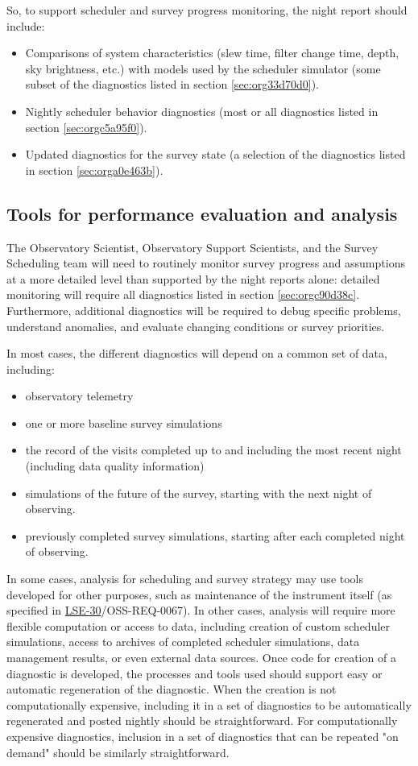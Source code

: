 So, to support scheduler and survey progress monitoring, the night report should include:
\begin{itemize}
\item Comparisons of system characteristics (slew time, filter change time, depth, sky brightness, etc.) with models used by the scheduler simulator (some subset of the diagnostics listed in section \ref{sec:org33d70d0}).
\item Nightly scheduler behavior diagnostics (most or all diagnostics listed in section \ref{sec:orgc5a95f0}).
\item Updated diagnostics for the survey state (a selection of the diagnostics listed in section \ref{sec:orga0e463b}).
\end{itemize}

\subsection{Tools for performance evaluation and analysis}
\label{sec:org88eed64}
The Observatory Scientist, Observatory Support Scientists, and the Survey Scheduling team will need to routinely monitor survey progress and assumptions at a more detailed level than supported by the night reports alone:
detailed monitoring will require all diagnostics listed in section \ref{sec:orgc90d38c}.
Furthermore, additional diagnostics will be required to debug specific problems, understand anomalies, and evaluate changing conditions or survey priorities.

In most cases, the different diagnostics will depend on a common set of data, including:
\begin{itemize}
\item observatory telemetry
\item one or more baseline survey simulations
\item the record of the visits completed up to and including the most recent night (including data quality information)
\item simulations of the future of the survey, starting with the next night of observing.
\item previously completed survey simulations, starting after each completed night of observing.
\end{itemize}

In some cases, analysis for scheduling and survey strategy may use tools developed for other purposes, such as maintenance of the instrument itself (as specified in \href{https://ls.st/lse-30}{LSE-30}/OSS-REQ-0067).
In other cases, analysis will require more flexible computation or access to data, including creation of custom scheduler simulations, access to archives of completed scheduler simulations, data management results, or even external data sources.
Once code for creation of a diagnostic is developed, the processes and tools used should support easy or automatic regeneration of the diagnostic.
When the creation is not computationally expensive, including it in a set of diagnostics to be automatically regenerated and posted nightly should be straightforward.
For computationally expensive diagnostics, inclusion in a set of diagnostics that can be repeated "on demand" should be similarly straightforward.

